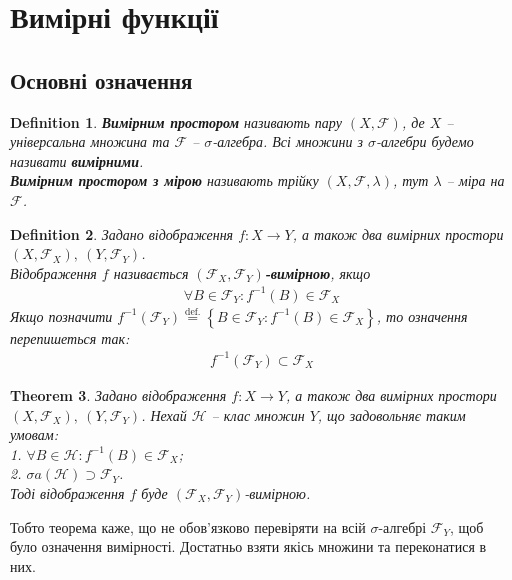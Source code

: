 \documentclass[a4paper, 10pt]{article}
\theoremstyle{theoremdd}
\newtheorem{theorem}{Theorem}[subsection]
\newtheorem{definition}[theorem]{Definition}
\begin{document}
\section{Вимірні функції}
\subsection{Основні означення}
\begin{definition}
\textbf{Вимірним простором} називають пару $(X,\mathcal{F})$, де $X$ -- універсальна множина та $\mathcal{F}$ -- $\sigma$-алгебра. Всі множини з $\sigma$-алгебри будемо називати \textbf{вимірними}.\\
\textbf{Вимірним простором з мірою} називають трійку $(X,\mathcal{F},\lambda)$, тут $\lambda$ -- міра на $\mathcal{F}$.
\end{definition}

\begin{definition}
Задано відображення $f \colon X \to Y$, а також два вимірних простори $(X,\mathcal{F}_X),\ (Y,\mathcal{F}_Y)$.\\
Відображення $f$ називається \textbf{$(\mathcal{F}_X,\mathcal{F}_Y)$-вимірною}, якщо
\begin{align*}
\forall B \in \mathcal{F}_Y: f^{-1}(B) \in \mathcal{F}_X
\end{align*}
Якщо позначити $f^{-1}(\mathcal{F}_Y) \overset{\text{def.}}{=} \left\{ B \in \mathcal{F}_Y : f^{-1}(B) \in \mathcal{F}_X \right\}$, то означення перепишеться так:
\begin{align*}
f^{-1}(\mathcal{F}_Y) \subset \mathcal{F}_X
\end{align*}
\end{definition}

\begin{theorem}
Задано відображення $f \colon X \to Y$, а також два вимірних простори $(X,\mathcal{F}_X),\ (Y,\mathcal{F}_Y)$. Нехай $\mathcal{H}$ -- клас множин $Y$, що задовольняє таким умовам:\\
1. $\forall B \in \mathcal{H}: f^{-1}(B) \in \mathcal{F}_X$;\\
2. $\sigma a(\mathcal{H}) \supset \mathcal{F}_Y$.\\
Тоді відображення $f$ буде $(\mathcal{F}_X,\mathcal{F}_Y)$-вимірною.
\end{theorem}
\noindent Тобто теорема каже, що не обов'язково перевіряти на всій $\sigma$-алгебрі $\mathcal{F}_Y$, щоб було означення вимірності. Достатньо взяти якісь множини та переконатися в них.
\end{document}
